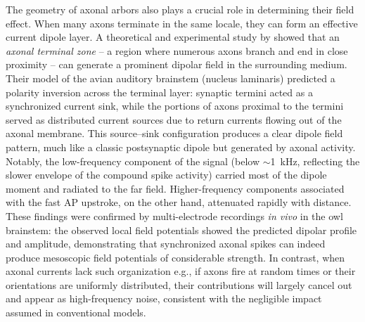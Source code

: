 \documentclass[final, a4paper,masters,en,listoffigures,listoftables,norwegiandates]{NMBU}
\begin{document}
The geometry of axonal arbors also plays a crucial role in determining their field effect. When many axons terminate in the same locale, they can form an effective current dipole layer. A theoretical and experimental study by \textcite{McColgan2017} showed that an \emph{axonal terminal zone} – a region where numerous axons branch and end in close proximity – can generate a prominent dipolar field in the surrounding medium. Their model of the avian auditory brainstem (nucleus laminaris) predicted a polarity inversion across the terminal layer: synaptic termini acted as a synchronized current sink, while the portions of axons proximal to the termini served as distributed current sources due to return currents flowing out of the axonal membrane. This source–sink configuration produces a clear dipole field pattern, much like a classic postsynaptic dipole but generated by axonal activity. Notably, the low-frequency component of the signal (below $\sim$1~kHz, reflecting the slower envelope of the compound spike activity) carried most of the dipole moment and radiated to the far field. Higher-frequency components associated with the fast AP upstroke, on the other hand, attenuated rapidly with distance. These findings were confirmed by multi-electrode recordings \emph{in vivo} in the owl brainstem: the observed local field potentials showed the predicted dipolar profile and amplitude, demonstrating that synchronized axonal spikes can indeed produce mesoscopic field potentials of considerable strength. In contrast, when axonal currents lack such organization e.g., if axons fire at random times or their orientations are uniformly distributed, their contributions will largely cancel out and appear as high-frequency noise, consistent with the negligible impact assumed in conventional models.
\end{document}

